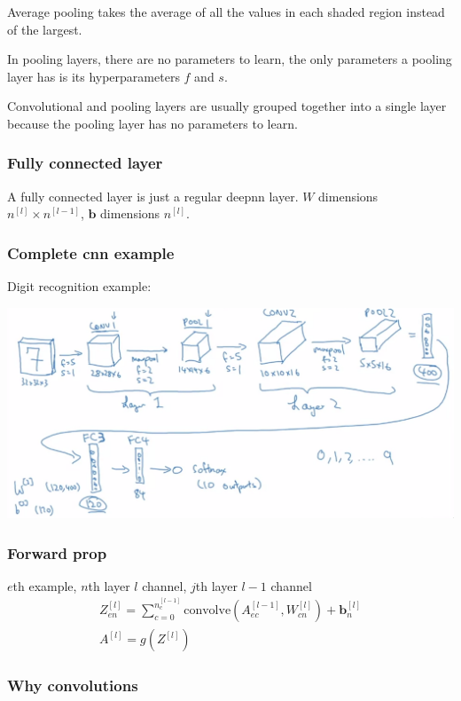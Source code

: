 \documentclass[12pt]{article}
\begin{document}
Average pooling takes the average of all the values in each shaded region instead of the
largest.

In pooling layers, there are no parameters to learn, the only parameters a pooling layer
has is its hyperparameters $f$ and $s$.

Convolutional and pooling layers are usually grouped together into a single layer because
the pooling layer has no parameters to learn.

\subsubsection{Fully connected layer}

A fully connected layer is just a regular deepnn layer. $W$ dimensions $n^{[l]} \times n^{[l-1]}$,
$\bm b$ dimensions $n^{[l]}$.

\subsubsection{Complete cnn example}

Digit recognition example:

\includegraphics[scale=.4]{images/cnn-example.png}

\subsubsection{Forward prop}

$e$th example, $n$th layer $l$ channel, $j$th layer $l-1$ channel
\begin{gather*}
    Z^{[l]}_{en} = \sum_{c=0}^{n_c^{[l-1]}}\text{convolve}(A^{[l-1]}_{ec},W^{[l]}_{cn}) + \bm b^{[l]}_n\\
    A^{[l]} = g(Z^{[l]})
\end{gather*}

\subsubsection{Why convolutions}
\end{document}
